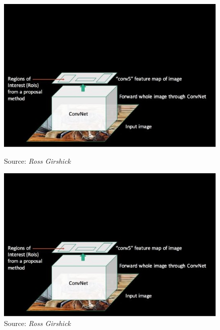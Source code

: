 \begin{frame}
	\vspace{1cm}
	\begin{columns}
		\begin{overlayarea}{\textwidth}{\textheight}
			\begin{figure}[h!]
				\begin{overprint}
					\centering\includegraphics[scale= 0.45]{images/40}\caption[Caption]{\hspace{-90pt} Source: \it{Ross Girshick}}
					\centering\includegraphics[scale= 0.45]{images/40}\caption[Caption]{\hspace{-90pt} Source: \it{Ross Girshick}}

\end{overprint}
\end{figure}
\end{overlayarea}
\end{columns}
\end{frame}
